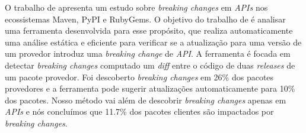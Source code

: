 O trabalho de  apresenta um estudo sobre \textit{breaking changes} em \textit{APIs} nos ecossistemas \textsf{Maven}, \textsf{PyPI} e \textsf{RubyGems}. O objetivo do trabalho de  é analisar uma ferramenta desenvolvida para esse propósito, que realiza automaticamente uma análise estática e eficiente para verificar se a atualização para uma versão de um provedor introduz uma \textit{breaking change} de \textit{API}. A ferramenta é focada em detectar \textit{breaking changes} computado um \textit{diff} entre o código de duas \textit{releases} de um pacote provedor. Foi descoberto \textit{breaking changes} em 26\% dos pacotes provedores e a ferramenta pode sugerir atualizações automaticamente para 10\% dos pacotes. Nosso método vai além de descobrir \textit{breaking changes} apenas em \textit{APIs} e nós concluímos que 11.7\% dos pacotes clientes são impactados por \textit{breaking changes}.